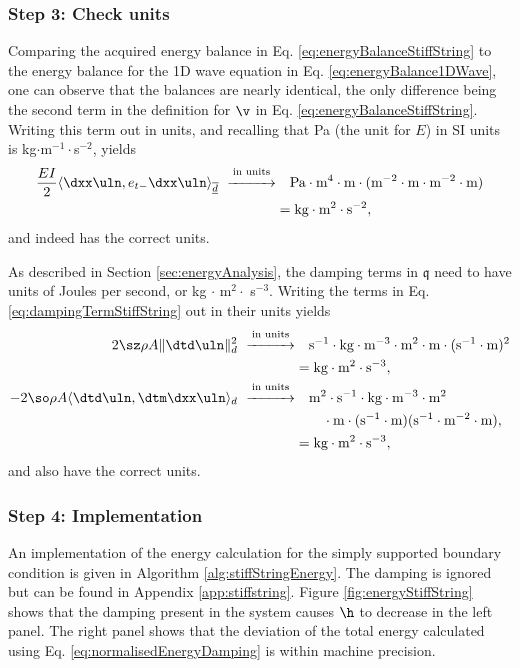 {\subsubsection{Step 3: Check units}
Comparing the acquired energy balance in Eq. \eqref{eq:energyBalanceStiffString} to the energy balance for the 1D wave equation in Eq. \eqref{eq:energyBalance1DWave}, one can observe that the balances are nearly identical, the only difference being the second term in the definition for $\v$ in Eq. \eqref{eq:energyBalanceStiffString}. 
Writing this term out in units, and recalling that Pa (the unit for $E$) in SI units is kg$\cdot$m$^{-1}\cdot$s$^{-2}$, yields
\begin{align*}
    \frac{EI}{2}\langle\dxx\uln, e_{t-}\dxx\uln\rangle_{\overline{\underline{d}}}\ \overset{\text{in units}}{\xrightarrow{\hspace*{1cm}}}& \quad \text{Pa}\cdot \text{m}^4 \cdot \text{m} \cdot (\text{m}^{-2} \cdot \text{m} \cdot \text{m}^{-2} \cdot \text{m}) \\
    & = \text{kg} \cdot \text{m}^2 \cdot \text{s}^{-2},
\end{align*}
and indeed has the correct units. 

As described in Section \ref{sec:energyAnalysis}, the damping terms in $\mathfrak{q}$ need to have units of Joules per second, or kg $\cdot$ m$^2 \cdot$ s$^{-3}$. Writing the terms in Eq. \eqref{eq:dampingTermStiffString} out in their units yields
\begin{align*}
    2\sz \rho A \lVert\dtd\uln\rVert_d^2\ \overset{\text{in units}}{\xrightarrow{\hspace*{1cm}}}&\quad \text{s}^{-1}\cdot\text{kg}\cdot\text{m}^{-3}\cdot\text{m}^2\cdot \text{m}\cdot(\text{s}^{-1}\cdot\text{m})^2 \\
    &= \text{kg} \cdot \text{m}^2 \cdot \text{s}^{-3},\\
    - 2 \so \rho A \langle \dtd \uln, \dtm \dxx \uln \rangle_d\  \overset{\text{in units}}{\xrightarrow{\hspace*{1cm}}}&\quad \text{m}^2\cdot\text{s}^{-1}\cdot\text{kg}\cdot\text{m}^{-3}\cdot\text{m}^2\\
    &\qquad\cdot\text{m}\cdot(\text{s}^{-1}\cdot\text{m})(\text{s}^{-1}\cdot\text{m}^{-2}\cdot \text{m}),\\
    &= \text{kg} \cdot \text{m}^2 \cdot \text{s}^{-3},
\end{align*}
and also have the correct units.
\subsubsection{Step 4: Implementation}
An implementation of the energy calculation for the simply supported boundary condition is given in Algorithm \ref{alg:stiffStringEnergy}. The damping is ignored but can be found in Appendix \ref{app:stiffstring}.  Figure \ref{fig:energyStiffString} shows that the damping present in the system causes $\h$ to decrease in the left panel. The right panel shows that the deviation of the total energy calculated using Eq. \eqref{eq:normalisedEnergyDamping} is within machine precision.

}

